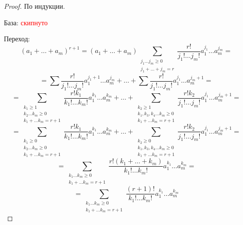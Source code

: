 \begin{proof}
    По индукции.

    База: \textcolor{red}{скипнуто}

    Переход: $$(a_1+\ldots+a_m)^{r+1}=(a_1+\ldots+a_m)\sum_{\substack{j_1\ldots j_m\ge 0 \\ j_1+\ldots+j_m=r}}\frac{r!}{j_1!\ldots j_m!}a_1^{j_1}\ldots a_m^{j_m}=$$
    $$=\sum \frac{r!}{j_1!\ldots j_m!}a_1^{j_1+1}\ldots a_m^{j_m}+\ldots+ \sum \frac{r!}{j_1!\ldots j_m!}a_1^{j_1}\ldots a_m^{j_m+1}=$$
    $$=\sum_{\substack{k_1 \ge 1 \\ k_2\ldots k_m \ge 0 \\ k_1+\ldots k_m=r+1}} \frac{r!k_1}{k_1!\ldots k_m!}a_1^{k_1}\ldots a_m^{k_m}+\ldots+ \sum_{\substack{k_2 \ge 1 \\ k_1,k_3,k_4\ldots k_m \ge 0 \\ k_1+\ldots k_m=r+1}} \frac{r!k_2}{j_1!\ldots j_m!}a_1^{j_1}\ldots a_m^{j_m+1}=$$
    $$=\sum_{\substack{k_1 \ge 0 \\ k_2\ldots k_m \ge 0 \\ k_1+\ldots k_m=r+1}} \frac{r!k_1}{k_1!\ldots k_m!}a_1^{k_1}\ldots a_m^{k_m}+\ldots+ \sum_{\substack{k_2 \ge 0 \\ k_1,k_3,k_4\ldots k_m \ge 0 \\ k_1+\ldots k_m=r+1}} \frac{r!k_2}{j_1!\ldots j_m!}a_1^{j_1}\ldots a_m^{j_m+1}=$$
    $$=\sum_{\substack{k_1\ldots k_m \ge 0 \\ k_1+\ldots k_m=r+1}}\frac{r!(k_1+\ldots+k_m)}{k_1!\ldots k_m!}a_1^{k_1}\ldots a_m^{k_m}=$$
    $$=\sum_{\substack{k_1\ldots k_m \ge 0 \\ k_1+\ldots k_m=r+1}}\frac{(r+1)!}{k_1!\ldots k_m!}a_1^{k_1}\ldots a_m^{k_m}$$
\end{proof}

